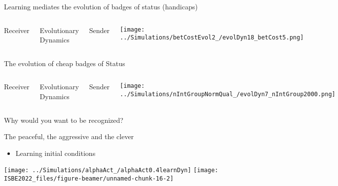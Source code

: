 \documentclass[
  ignorenonframetext,
  aspectratio=169]{beamer}
\providecommand{\tightlist}{%
  \setlength{\itemsep}{0pt}\setlength{\parskip}{0pt}}
\begin{document}
\begin{frame}{Learning mediates the evolution of badges of status
(handicaps)}
\protect\hypertarget{learning-mediates-the-evolution-of-badges-of-status-handicaps-1}{}
\begin{columns}[T]



\tiny
\vspace{1cm}

Receiver  

\vspace{2cm}

Evolutionary  \\
Dynamics

\vspace{2cm}

Sender


\texttt{[image: ../Simulations/betCostEvol2\_/evolDyn18\_betCost5.png]}

\end{columns}
\end{frame}

\begin{frame}{The evolution of cheap badges of Status}
\protect\hypertarget{the-evolution-of-cheap-badges-of-status}{}
\begin{columns}[T]



\tiny
\vspace{1cm}

Receiver  

\vspace{2cm}

Evolutionary  \\
Dynamics

\vspace{2cm}

Sender


\texttt{[image: ../Simulations/nIntGroupNormQual\_/evolDyn7\_nIntGroup2000.png]}

\end{columns}
\end{frame}

\begin{frame}{Why would you want to be recognized?}
\protect\hypertarget{why-would-you-want-to-be-recognized}{}
\vspace{-1cm}

\begin{block}{The peaceful, the aggressive and the clever}
\protect\hypertarget{the-peaceful-the-aggressive-and-the-clever}{}
\begin{itemize}
\tightlist
\item
  Learning initial conditions
\end{itemize}

\texttt{[image: ../Simulations/alphaAct\_/alphaAct0.4learnDyn]}
\texttt{[image: ISBE2022\_files/figure-beamer/unnamed-chunk-16-2]}
\end{block}
\end{frame}
\end{document}
